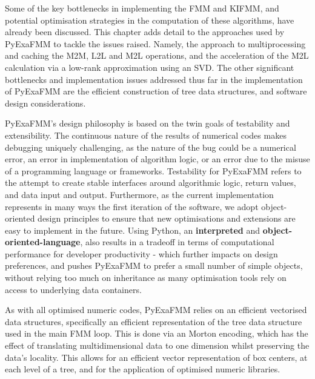 Some of the key bottlenecks in implementing the \gls{FMM} and \gls{KIFMM}, and potential
optimisation strategies in the computation of these algorithms, have already been
discussed. This chapter adds detail to the approaches used by \gls{PyExaFMM} to tackle
the issues raised. Namely, the approach to multiprocessing and caching the \gls{M2M},
\gls{L2L} and \gls{M2L} operations, and the acceleration of the \gls{M2L} calculation
via a low-rank approximation using an \gls{SVD}. The other significant bottlenecks
and implementation issues addressed thus far in the implementation of \gls{PyExaFMM} are the
efficient construction of tree data structures, and software design considerations.

\gls{PyExaFMM}'s design philosophy is based on the twin goals of testability
and extensibility. The continuous nature of the results of numerical codes makes
debugging uniquely challenging, as the nature of the bug could be a numerical error,
an error in implementation of algorithm logic, or an error due to the misuse of a
programming language or frameworks. Testability for \gls{PyExaFMM} refers to
the attempt to create stable interfaces around algorithmic logic, return values,
and data input and output. Furthermore, as the current implementation represents
in many ways the first iteration of the software, we adopt object-oriented
design principles to ensure that new optimisations and extensions are easy
to implement in the future. Using Python, an \textbf{\gls{interpreted}} and
\textbf{\gls{object-oriented-language}}, also results in a tradeoff in terms of
computational performance for developer productivity - which further impacts
on design preferences, and pushes \gls{PyExaFMM} to prefer a small number of
simple objects, without relying too much on inheritance as many optimisation tools
rely on access to underlying data containers.

As with all optimised numeric codes, \gls{PyExaFMM} relies on an efficient
vectorised data structures, specifically an efficient representation of the tree
data structure used in the main \gls{FMM} loop. This is done via an Morton encoding,
which has the effect of translating multidimensional data to one dimension whilst
preserving the data's locality. This allows for an efficient vector representation
of box centers, at each level of a tree, and for the application of optimised
numeric libraries.
